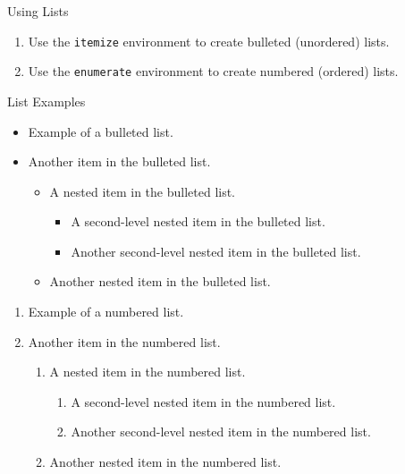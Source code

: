 \documentclass[8pt]{beamer}
\begin{document}
\begin{frame}{\insertsection}{\insertsubsection}

    \begin{block}{Using Lists}
        \begin{enumerate}
            \item Use the \lstinline|itemize| environment to create bulleted (unordered) lists.
            \item Use the \lstinline|enumerate| environment to create numbered (ordered) lists.
        \end{enumerate}
    \end{block}

    \begin{block}{List Examples}

        \begin{itemize}
            \item Example of a bulleted list.
            \item Another item in the bulleted list.
            \begin{itemize}
                \item A nested item in the bulleted list.
                \begin{itemize}
                    \item A second-level nested item in the bulleted list.
                    \item Another second-level nested item in the bulleted list.
                \end{itemize}
                \item Another nested item in the bulleted list.
            \end{itemize}
        \end{itemize}

        \begin{enumerate}
            \item Example of a numbered list.
            \item Another item in the numbered list.
            \begin{enumerate}
                \item A nested item in the numbered list.
                \begin{enumerate}
                    \item A second-level nested item in the numbered list.
                    \item Another second-level nested item in the numbered list.
                \end{enumerate}
                \item Another nested item in the numbered list.
            \end{enumerate}
        \end{enumerate}

    \end{block}

\end{frame}
\end{document}
